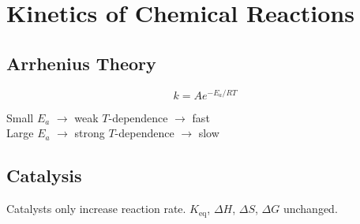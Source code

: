 \section{Kinetics of Chemical Reactions}

\subsection*{Arrhenius Theory}

\begin{equation*}
    k = Ae^{-E_a/RT}
\end{equation*}

Small $E_a$ $\rightarrow$ weak $T$-dependence $\rightarrow$ fast \\
Large $E_a$ $\rightarrow$ strong $T$-dependence $\rightarrow$ slow \\

\subsection*{Catalysis}
Catalysts only increase reaction rate. $K_{\mathrm{eq}}$, $\Delta H$, $\Delta S$, $\Delta G$ unchanged.